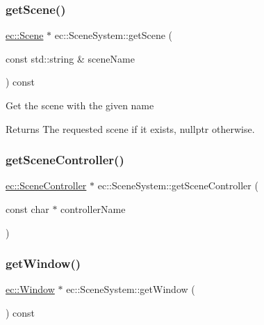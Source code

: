 \mbox{\label{classec_1_1_scene_system_a25b2df199ddab1abc0e2e3f2c87bb690}} 
\subsubsection{\texorpdfstring{get\+Scene()}{getScene()}}
{\footnotesize\ttfamily \mbox{\hyperlink{classec_1_1_scene}{ec\+::\+Scene}} $\ast$ ec\+::\+Scene\+System\+::get\+Scene (\begin{DoxyParamCaption}\item[{const std\+::string \&}]{scene\+Name }\end{DoxyParamCaption}) const}

Get the scene with the given name \begin{DoxyReturn}{Returns}
The requested scene if it exists, nullptr otherwise. 
\end{DoxyReturn}
\mbox{\label{classec_1_1_scene_system_a0f897d342ba9a7ed8a06a478e6834c6c}} 
\subsubsection{\texorpdfstring{get\+Scene\+Controller()}{getSceneController()}}
{\footnotesize\ttfamily \mbox{\hyperlink{classec_1_1_scene_controller}{ec\+::\+Scene\+Controller}} $\ast$ ec\+::\+Scene\+System\+::get\+Scene\+Controller (\begin{DoxyParamCaption}\item[{const char $\ast$}]{controller\+Name }\end{DoxyParamCaption})}

\mbox{\label{classec_1_1_scene_system_afc687c570e4c1b83a85bf2bd69fa86eb}} 
\subsubsection{\texorpdfstring{get\+Window()}{getWindow()}}
{\footnotesize\ttfamily \mbox{\hyperlink{classec_1_1_window}{ec\+::\+Window}} $\ast$ ec\+::\+Scene\+System\+::get\+Window (\begin{DoxyParamCaption}{ }\end{DoxyParamCaption}) const}

